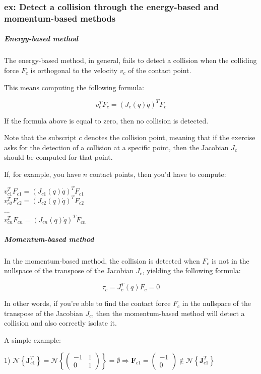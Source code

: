 \documentclass[a4paper,12pt]{article}
\begin{document}
\subsubsection{ex: Detect a collision through the energy-based
and momentum-based methods}
\subparagraph{Energy-based method}
The energy-based method, in general, fails to detect a collision when the
colliding force $F_c$ is orthogonal to the velocity $v_c$ of the contact point.

This means computing the following formula:
\begin{center}
    \begin{equation}
        v_{c}^T F_{c} = (J_{c}(q)\dot{q})^T F_{c}
    \end{equation}
\end{center}

If the formula above is equal to zero, then no collision is detected.

Note that the subscript $c$ denotes the collision point, meaning that if the exercise asks for the detection
of a collision at a specific point, then the Jacobian $J_{c}$ should be computed for that point.

If, for example, you have $n$ contact points, then you'd have to compute:
\begin{center}
    $v_{c1}^T F_{c1} = (J_{c1}(q)\dot{q})^T F_{c1}$ \\
    $v_{c2}^T F_{c2} = (J_{c2}(q)\dot{q})^T F_{c2}$ \\
    ... \\
    $v_{cn}^T F_{cn} = (J_{cn}(q)\dot{q})^T F_{cn}$
\end{center}

\subparagraph{Momentum-based method}
In the momentum-based method, the collision is detected when $F_c$ is not in the nullspace
of the transpose of the Jacobian $J_c$, yielding the following formula:
\begin{center}
    \begin{equation}
        \tau_{c} = J^T_{c}(q) F_{c} = 0
    \end{equation}
\end{center}

In other words, if you're able to find the contact force $F_c$ in the nullspace of the transpose of the Jacobian $J_c$,
then the momentum-based method will detect a collision and also correctly isolate it.

A simple example:

\begin{center}
1) $\mathcal{N}\left\{\boldsymbol{J}_{c1}^T\right\} = \mathcal{N}\left\{\left(\begin{array}{cc}
    -1 & 1 \\
    0 & 1
    \end{array}\right)\right\} = \emptyset \Rightarrow \boldsymbol{F}_{c1} = \left(\begin{array}{c}
    -1 \\
    0
    \end{array}\right) \notin \mathcal{N}\left\{\boldsymbol{J}_{c1}^T\right\}$
\end{center}
\end{document}

